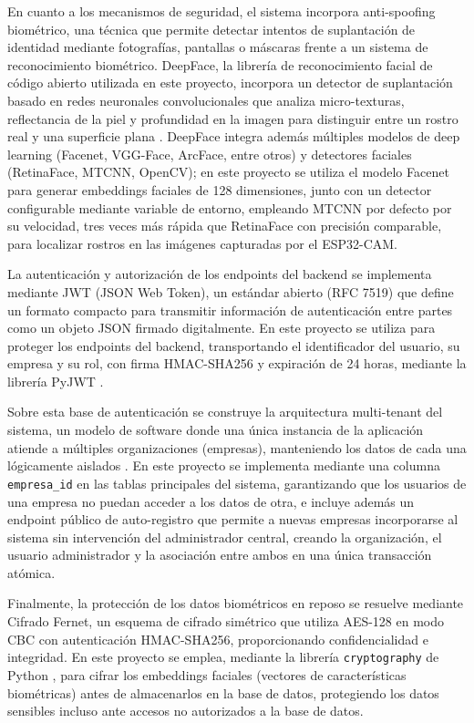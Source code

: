 \documentclass{iccmemoria}
\begin{document}
En cuanto a los mecanismos de seguridad, el sistema incorpora anti-spoofing biométrico, una técnica que permite detectar intentos de suplantación de identidad mediante fotografías, pantallas o máscaras frente a un sistema de reconocimiento biométrico. DeepFace, la librería de reconocimiento facial de código abierto utilizada en este proyecto, incorpora un detector de suplantación basado en redes neuronales convolucionales que analiza micro-texturas, reflectancia de la piel y profundidad en la imagen para distinguir entre un rostro real y una superficie plana \cite{serengil_deepface}. DeepFace integra además múltiples modelos de deep learning (Facenet, VGG-Face, ArcFace, entre otros) y detectores faciales (RetinaFace, MTCNN, OpenCV); en este proyecto se utiliza el modelo Facenet para generar embeddings faciales de 128 dimensiones, junto con un detector configurable mediante variable de entorno, empleando MTCNN por defecto por su velocidad, tres veces más rápida que RetinaFace con precisión comparable, para localizar rostros en las imágenes capturadas por el ESP32-CAM.

La autenticación y autorización de los endpoints del backend se implementa mediante JWT (JSON Web Token), un estándar abierto (RFC 7519) que define un formato compacto para transmitir información de autenticación entre partes como un objeto JSON firmado digitalmente. En este proyecto se utiliza para proteger los endpoints del backend, transportando el identificador del usuario, su empresa y su rol, con firma HMAC-SHA256 y expiración de 24 horas, mediante la librería PyJWT \cite{pyjwt_docs}.

Sobre esta base de autenticación se construye la arquitectura multi-tenant del sistema, un modelo de software donde una única instancia de la aplicación atiende a múltiples organizaciones (empresas), manteniendo los datos de cada una lógicamente aislados \cite{microsoft_multitenant}. En este proyecto se implementa mediante una columna \texttt{empresa\_id} en las tablas principales del sistema, garantizando que los usuarios de una empresa no puedan acceder a los datos de otra, e incluye además un endpoint público de auto-registro que permite a nuevas empresas incorporarse al sistema sin intervención del administrador central, creando la organización, el usuario administrador y la asociación entre ambos en una única transacción atómica.

Finalmente, la protección de los datos biométricos en reposo se resuelve mediante Cifrado Fernet, un esquema de cifrado simétrico que utiliza AES-128 en modo CBC con autenticación HMAC-SHA256, proporcionando confidencialidad e integridad. En este proyecto se emplea, mediante la librería \texttt{cryptography} de Python \cite{cryptography_docs}, para cifrar los embeddings faciales (vectores de características biométricas) antes de almacenarlos en la base de datos, protegiendo los datos sensibles incluso ante accesos no autorizados a la base de datos.
\end{document}
